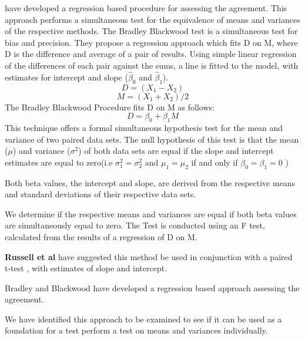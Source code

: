 \documentclass[12pt, a4paper]{report}
\theoremstyle{plain}
\theoremstyle{definition}
\theoremstyle{remark}
\begin{document}
	
	\citet{BB89} have developed a regression based procedure for
	assessing the agreement. This approach performs a simultaneous test for the equivalence of
	means and variances of the respective methods. The Bradley Blackwood test is a simultaneous test for bias and
	precision. They propose a regression approach which fits D on M,
	where D is the difference and average of a pair of results. Using simple linear
	regression of the differences of each pair against the sums, a
	line is fitted to the model, with estimates for intercept and
	slope ($\hat{\beta}_{0}$ and $\hat{\beta}_{1}$).
	\begin{equation}
	D = (X_{1}-X_{2})
	\end{equation}
	\begin{equation}
	M = (X_{1} + X_{2}) /2
	\end{equation}
	The Bradley Blackwood Procedure fits D on M as follows:\\
	\begin{equation}
	D = \beta_{0} + \beta_{1}M
	\end{equation}
	This technique offers a formal simultaneous hypothesis test for the
	mean and variance of two paired data sets.  The null
	hypothesis of this test is that the mean ($\mu$) and variance
	($\sigma^{2}$) of both data sets are equal if the slope and
	intercept estimates are equal to zero(i.e $\sigma^{2}_{1} =
	\sigma^{2}_{2}$ and $\mu_{1}=\mu_{2}$ if and only if $\beta_{0}=
	\beta_{1}=0$ )
	
	Both beta values, the intercept and slope, are derived from the respective means and
	standard deviations of their respective data sets.
	
	We determine if the respective means and variances are equal if
	both beta values are simultaneously equal to zero. The Test is
	conducted using an F test, calculated from the results of a
	regression of D on M.
	
	
	\textbf{Russell et al} have suggested this method be used in conjunction with a paired t-test , with estimates of slope and intercept.
	
	Bradley and Blackwood have developed a regression based approach
	assessing the agreement.
	
	We have identified this approach  to be examined to see if it can
	be used as a foundation for a test perform a test on means and variances individually.
	
\end{document}
